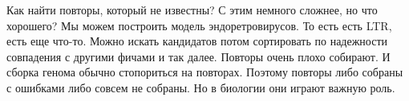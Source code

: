 Как найти повторы, который не известны? С этим немного сложнее, но что хорошего? 
Мы можем построить модель эндоретровирусов. То есть есть LTR, есть еще что-то. Можно 
искать кандидатов потом сортировать по надежности совпадения с другими фичами и так далее. 
Повторы очень плохо собирают. И сборка генома обычно стопориться на повторах. Поэтому 
повторы либо собраны с ошибками либо совсем не собраны. Но в биологии они играют важную роль. 


